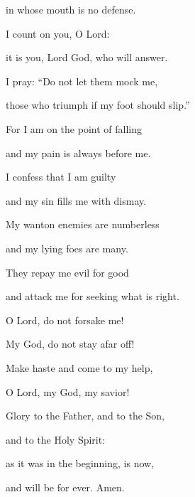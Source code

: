 in whose mouth is no defense.

\noindent I count on you, O Lord:~\GreStar{}~\nopagebreak

it is you, Lord God, who will answer.

\noindent I pray: “Do not let them mock me,~\GreStar{}~\nopagebreak

those who triumph if my foot should slip.”

\noindent For I am on the point of falling~\GreStar{}~\nopagebreak

and my pain is always before me.

\noindent I confess that I am guilty~\GreStar{}~\nopagebreak

and my sin fills me with dismay.

\noindent My wanton enemies are numberless~\GreStar{}~\nopagebreak

and my lying foes are many.

\noindent They repay me evil for good~\GreStar{}~\nopagebreak

and attack me for seeking what is right.

\noindent O Lord, do not forsake me!~\GreStar{}~\nopagebreak

My God, do not stay afar off!

\noindent Make haste and come to my help,~\GreStar{}~\nopagebreak

O Lord, my God, my savior!

\noindent Glory to the Father, and to the Son,~\GreStar{}~\nopagebreak

and to the Holy Spirit:

\noindent as it was in the beginning, is now,~\GreStar{}~\nopagebreak

and will be for ever. Amen.
